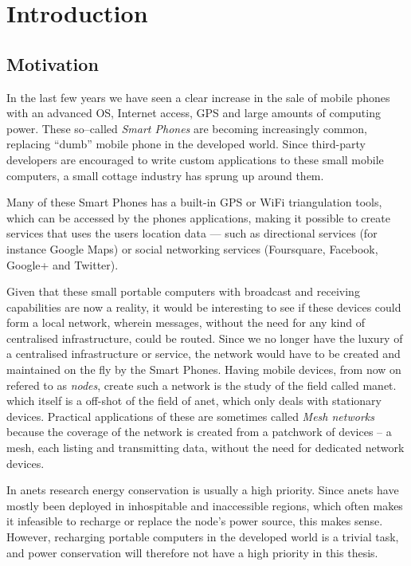 \section{Introduction}
\label{section:introduction} 

\subsection{Motivation}

In the last few years we have seen a clear increase in the sale of mobile phones with an advanced OS, Internet access, GPS and large amounts of computing power. These so--called \emph{Smart Phones} are becoming increasingly common, replacing ``dumb'' mobile phone in the developed world. Since third-party developers are encouraged to write custom applications to these small mobile computers, a small cottage industry has sprung up around them.
 
Many of these Smart Phones has a built-in GPS or WiFi triangulation tools, which can be accessed by the phones applications, making it possible to create services that uses the users location data --- such as directional services (for instance Google Maps) or social networking services (Foursquare, Facebook, Google+ and Twitter).

Given that these small portable computers with broadcast and receiving capabilities are now a reality, it would be interesting to see if these devices could form a local network, wherein messages, without the need for any kind of centralised infrastructure, could be routed. Since we no longer have the luxury of a centralised infrastructure or service, the network would have to be created and maintained on the fly by the Smart Phones. Having mobile devices, from now on refered to as \emph{nodes}, create such a network is the study of the field called \ac{manet}. which itself is a off-shot of the field of \ac{anet}, which only deals with stationary devices. Practical applications of these are sometimes called \emph{Mesh networks} because the coverage of the network is created from a patchwork of devices -- a mesh, each listing and transmitting data, without the need for dedicated network devices.  

In \acp{anet} research energy conservation is usually a high priority. Since \acp{anet} have mostly been deployed in inhospitable and inaccessible regions, which often makes it infeasible to recharge or replace the node's power source, this makes sense. However, recharging portable computers in the developed world is a trivial task, and power conservation will therefore not have a high priority in this thesis. 

